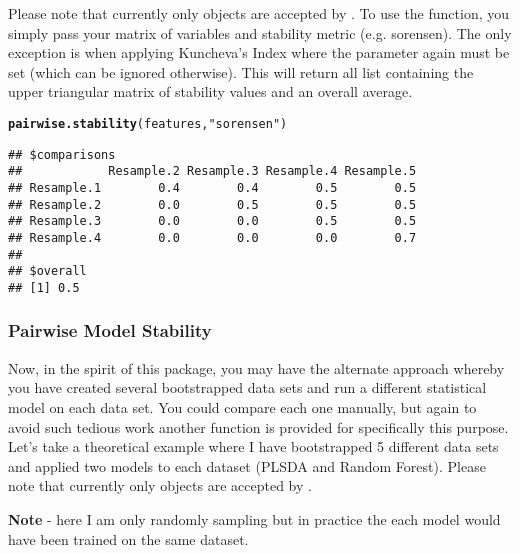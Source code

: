 \documentclass[12pt]{article}\usepackage[]{graphicx}\usepackage[usenames,dvipsnames]{color}
\makeatletter
\newcommand{\hlstr}[1]{\textcolor[rgb]{0.192,0.494,0.8}{#1}}%
\newcommand{\hlstd}[1]{\textcolor[rgb]{0.345,0.345,0.345}{#1}}%
\newcommand{\hlkwd}[1]{\textcolor[rgb]{0.737,0.353,0.396}{\textbf{#1}}}%
\newenvironment{kframe}{%
 \def\at@end@of@kframe{}%
 \ifinner\ifhmode%
  \def\at@end@of@kframe{\end{minipage}}%
  \begin{minipage}{\columnwidth}%
 \fi\fi%
 \def\FrameCommand##1{\hskip\@totalleftmargin \hskip-\fboxsep
 \colorbox{shadecolor}{##1}\hskip-\fboxsep
     \hskip-\linewidth \hskip-\@totalleftmargin \hskip\columnwidth}%
 \MakeFramed {\advance\hsize-\width
   \@totalleftmargin\z@ \linewidth\hsize
   \@setminipage}}%
 {\par\unskip\endMakeFramed%
 \at@end@of@kframe}
\newenvironment{knitrout}{}{} %
\makeatother
\begin{document}
Please note that currently only  objects are accepted by
.  To use the function, you simply pass your 
matrix of variables and stability metric (e.g. sorensen).  The only exception
is when applying Kuncheva's Index where the  parameter again must
be set (which can be ignored otherwise).  This will return all list containing 
the upper triangular matrix of stability values and an overall average.

\begin{knitrout}
\color{fgcolor}\begin{kframe}
\begin{alltt}
\hlkwd{pairwise.stability}\hlstd{(features,} \hlstr{"sorensen"}\hlstd{)}
\end{alltt}
\begin{verbatim}
## $comparisons
##            Resample.2 Resample.3 Resample.4 Resample.5
## Resample.1        0.4        0.4        0.5        0.5
## Resample.2        0.0        0.5        0.5        0.5
## Resample.3        0.0        0.0        0.5        0.5
## Resample.4        0.0        0.0        0.0        0.7
## 
## $overall
## [1] 0.5
\end{verbatim}
\end{kframe}
\end{knitrout}

\newpage
\subsubsection{Pairwise Model Stability}

Now, in the spirit of this package, you may have the alternate approach whereby
you have created several bootstrapped data sets and run a different statistical
model on each data set.  You could compare each one manually, but again to 
avoid such tedious work another function is provided for specifically this
purpose.  Let's take a theoretical example where I have bootstrapped 5 different
data sets and applied two models to each dataset (PLSDA and Random Forest).
Please note that currently only  objects are accepted by
.

\textbf{Note} - here I am only randomly sampling but in practice the each model
would have been trained on the same dataset. 
\end{document}
